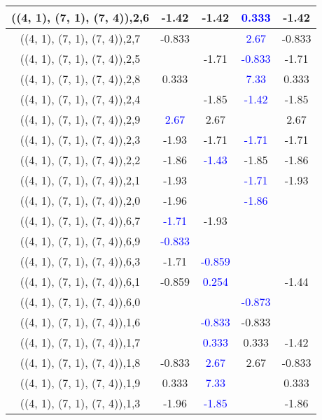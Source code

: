 \documentclass{article}
\begin{document}
\begin{center}
\begin{longtable}{|c|c|c|c|c|}
        	\hline
        	((4, 1), (7, 1), (7, 4)),2,6&-1.42&-1.42& \textcolor{blue}{0.333}&-1.42\\
        	\hline
        	((4, 1), (7, 1), (7, 4)),2,7&-0.833&& \textcolor{blue}{2.67}&-0.833\\
        	\hline
        	((4, 1), (7, 1), (7, 4)),2,5&&-1.71& \textcolor{blue}{-0.833}&-1.71\\
        	\hline
        	((4, 1), (7, 1), (7, 4)),2,8&0.333&& \textcolor{blue}{7.33}&0.333\\
        	\hline
        	((4, 1), (7, 1), (7, 4)),2,4&&-1.85& \textcolor{blue}{-1.42}&-1.85\\
        	\hline
        	((4, 1), (7, 1), (7, 4)),2,9& \textcolor{blue}{2.67}&2.67&&2.67\\
        	\hline
        	((4, 1), (7, 1), (7, 4)),2,3&-1.93&-1.71& \textcolor{blue}{-1.71}&-1.71\\
        	\hline
        	((4, 1), (7, 1), (7, 4)),2,2&-1.86& \textcolor{blue}{-1.43}&-1.85&-1.86\\
        	\hline
        	((4, 1), (7, 1), (7, 4)),2,1&-1.93&& \textcolor{blue}{-1.71}&-1.93\\
        	\hline
        	((4, 1), (7, 1), (7, 4)),2,0&-1.96&& \textcolor{blue}{-1.86}&\\
        	\hline
        	((4, 1), (7, 1), (7, 4)),6,7& \textcolor{blue}{-1.71}&-1.93&&\\
        	\hline
        	((4, 1), (7, 1), (7, 4)),6,9& \textcolor{blue}{-0.833}&&&\\
        	\hline
        	((4, 1), (7, 1), (7, 4)),6,3&-1.71& \textcolor{blue}{-0.859}&&\\
        	\hline
        	((4, 1), (7, 1), (7, 4)),6,1&-0.859& \textcolor{blue}{0.254}&&-1.44\\
        	\hline
        	((4, 1), (7, 1), (7, 4)),6,0&&& \textcolor{blue}{-0.873}&\\
        	\hline
        	((4, 1), (7, 1), (7, 4)),1,6&& \textcolor{blue}{-0.833}&-0.833&\\
        	\hline
        	((4, 1), (7, 1), (7, 4)),1,7&& \textcolor{blue}{0.333}&0.333&-1.42\\
        	\hline
        	((4, 1), (7, 1), (7, 4)),1,8&-0.833& \textcolor{blue}{2.67}&2.67&-0.833\\
        	\hline
        	((4, 1), (7, 1), (7, 4)),1,9&0.333& \textcolor{blue}{7.33}&&0.333\\
        	\hline
        	((4, 1), (7, 1), (7, 4)),1,3&-1.96& \textcolor{blue}{-1.85}&&-1.86\\

\end{longtable}
\end{center}
\end{document}
